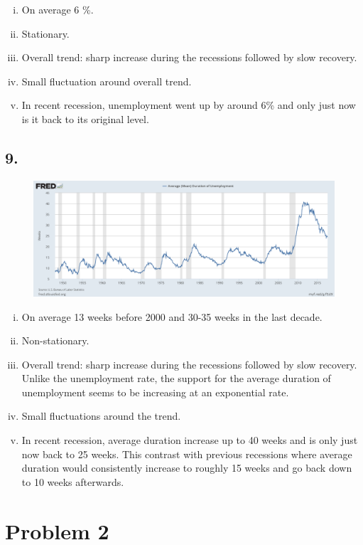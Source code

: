 \documentclass[12pt]{article}
\theoremstyle{definition}
\begin{document}
\begin{enumerate}[(i)]
	\item On average 6 \%.
	\item Stationary.
	\item Overall trend: sharp increase during the recessions followed by slow recovery.
	\item Small fluctuation around overall trend.
	\item In recent recession, unemployment went up by around 6\% and only just now is it back to its original level.
\end{enumerate}

\subsection*{9.}
\begin{figure}[H]
	\centering
	\includegraphics[width=0.9\linewidth]{plot9}
	\label{fig:plot9}
\end{figure}

\begin{enumerate}[(i)]
	\item On average 13 weeks before 2000 and 30-35 weeks in the last decade.
	\item Non-stationary.
	\item Overall trend: sharp increase during the recessions followed by slow recovery. Unlike the unemployment rate, the support for the average duration of unemployment seems to be increasing at an exponential rate.
	\item Small fluctuations around the trend. 
	\item In recent recession, average duration increase up to 40 weeks and is only just now back to 25 weeks. This contrast with previous recessions where average duration would consistently increase to roughly 15 weeks and go back down to 10 weeks afterwards.
\end{enumerate}


\section*{Problem 2}
\end{document}
